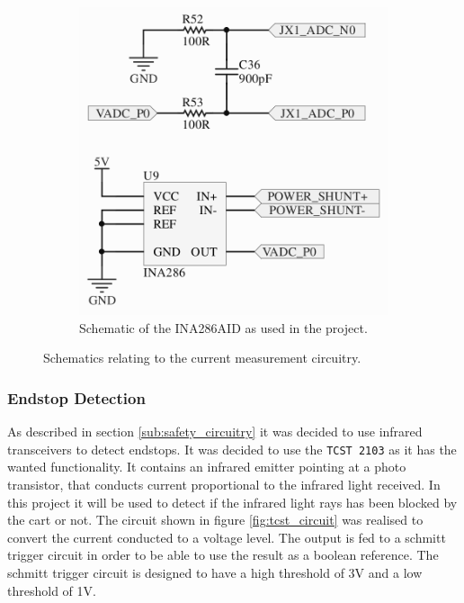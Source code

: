 \begin{figure}
\begin{subfigure}[b]{0.49\textwidth}
		\includegraphics[width=\linewidth]{graphics/ina286}
		\caption{Schematic of the INA286AID as used in the project.}
		\label{sfig:ina286aidschematic}
	\end{subfigure}
	\caption{Schematics relating to the current measurement circuitry.}
	\label{fig:currentmeasure}
\end{figure}





\subsubsection{Endstop Detection} %
\label{ssub:endstop_detection}
As described in section \ref{sub:safety_circuitry} it was decided to use infrared transceivers to detect endstops.
It was decided to use the \texttt{TCST 2103} as it has the wanted functionality.
It contains an infrared emitter pointing at a photo transistor, that conducts current proportional to the infrared light received.
In this project it will be used to detect if the infrared light rays has been blocked by the cart or not. 
The circuit shown in figure \ref{fig:tcst_circuit} was realised to convert the current conducted to a voltage level. 
The output is fed to a schmitt trigger circuit in order to be able to use the result as a boolean reference.
The schmitt trigger circuit is designed to have a high threshold of 3V and a low threshold of 1V. 

